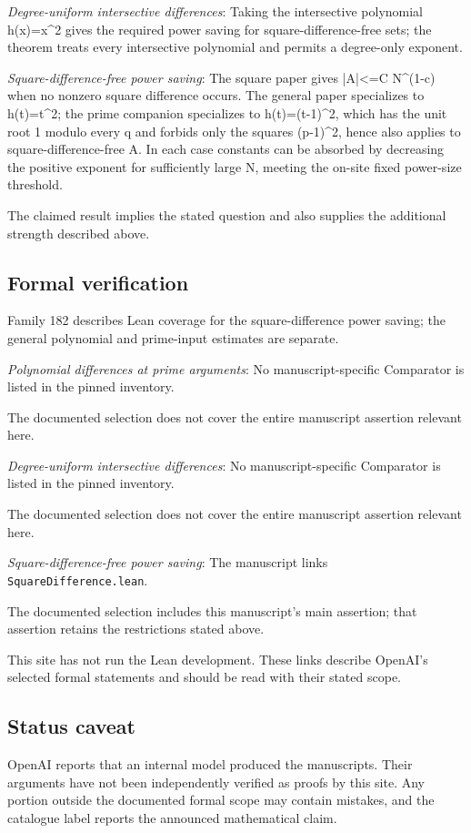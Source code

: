 \documentclass[11pt]{article}
\begin{document}
\textit{Degree-uniform intersective differences}: Taking the intersective polynomial h(x)=x\textasciicircum{}2 gives the required power saving for square-difference-free sets; the theorem treats every intersective polynomial and permits a degree-only exponent.

\textit{Square-difference-free power saving}: The square paper gives |A|<=C N\textasciicircum{}(1-c) when no nonzero square difference occurs. The general paper specializes to h(t)=t\textasciicircum{}2; the prime companion specializes to h(t)=(t-1)\textasciicircum{}2, which has the unit root 1 modulo every q and forbids only the squares (p-1)\textasciicircum{}2, hence also applies to square-difference-free A. In each case constants can be absorbed by decreasing the positive exponent for sufficiently large N, meeting the on-site fixed power-size threshold.

The claimed result implies the stated question and also supplies the additional strength described above.

\subsection{Formal verification}
Family 182 describes Lean coverage for the square-difference power saving; the general polynomial and prime-input estimates are separate.

\textit{Polynomial differences at prime arguments}: No manuscript-specific Comparator is listed in the pinned inventory.

The documented selection does not cover the entire manuscript assertion relevant here.

\textit{Degree-uniform intersective differences}: No manuscript-specific Comparator is listed in the pinned inventory.

The documented selection does not cover the entire manuscript assertion relevant here.

\textit{Square-difference-free power saving}: The manuscript links \texttt{SquareDifference.lean}.

The documented selection includes this manuscript’s main assertion; that assertion retains the restrictions stated above.

This site has not run the Lean development. These links describe OpenAI’s selected formal statements and should be read with their stated scope.

\subsection{Status caveat}
OpenAI reports that an internal model produced the manuscripts. Their arguments have not been independently verified as proofs by this site. Any portion outside the documented formal scope may contain mistakes, and the catalogue label reports the announced mathematical claim.
\end{document}
